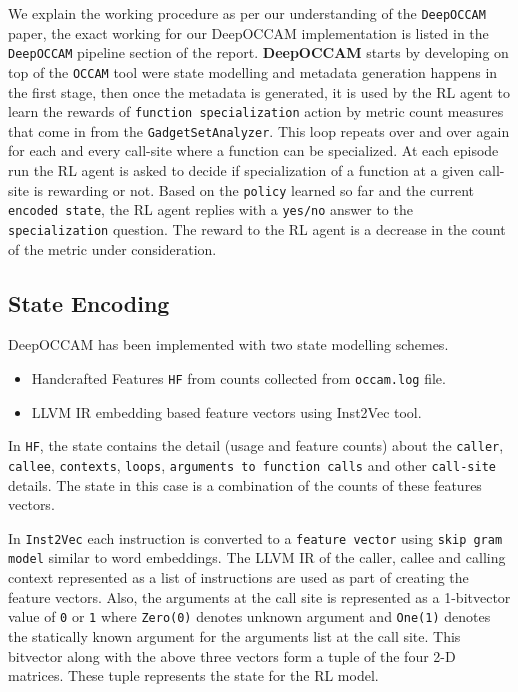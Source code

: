 \documentclass{relatorio}
\begin{document}
We explain the working procedure as per our understanding of the \texttt{DeepOCCAM} paper, the exact working for our DeepOCCAM implementation is listed in the \texttt{DeepOCCAM} pipeline section of the report. \textbf{DeepOCCAM} starts by developing on top of the \texttt{OCCAM} tool were state modelling and metadata generation happens in the first stage, then once the metadata is  generated, it is used by the RL agent to learn the rewards of \texttt{function specialization} action by metric count measures that come in from the \texttt{GadgetSetAnalyzer}. This loop repeats over and over again for each and every call-site where a function can be specialized. At each episode run the RL agent is asked to decide if specialization of a function at a given call-site is rewarding or not. Based on the \texttt{policy} learned so far and the current \texttt{encoded state}, the RL agent replies with a \texttt{yes/no} answer to the \texttt{specialization} question. The reward to the RL agent is a decrease in the count of the metric under consideration. 

\subsection{State Encoding}%
\label{Tools}

DeepOCCAM has been implemented with two state modelling schemes. 

\begin{itemize}
	\item Handcrafted Features \texttt{HF} from counts collected from \texttt{occam.log} file.
\\ 
	\item LLVM IR embedding based feature vectors using Inst2Vec tool. \\
\end{itemize}

In \texttt{HF}, the state contains the detail (usage and feature counts) about the \texttt{caller}, \texttt{callee}, \texttt{contexts}, \texttt{loops}, \texttt{arguments to function calls} and other \texttt{call-site} details. The state in this case is a combination of the counts of these features vectors.

In \texttt{Inst2Vec} each instruction is converted to a \texttt{feature vector} using \texttt{skip gram model} similar to word embeddings. The LLVM IR of the caller, callee and calling context represented as a list of instructions are used as part of creating the feature vectors. Also, the arguments at the call site is represented as a 1-bitvector value of \texttt{0} or \texttt{1} where \texttt{Zero(0)} denotes unknown argument and \texttt{One(1)} denotes the statically known argument for the arguments list at the call site.
This bitvector along with the above three vectors form a tuple of the four 2-D matrices. These tuple represents the state for the RL model. 
\end{document}
